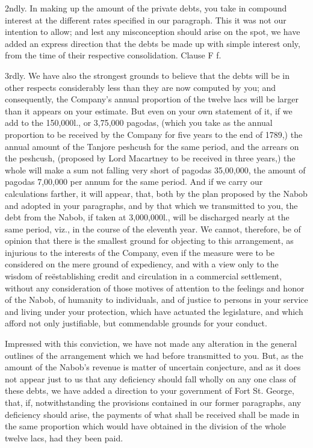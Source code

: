 2ndly. In making up the amount of the private debts, you take in compound interest at the different rates specified in our paragraph. This it was not our intention to allow; and lest any misconception should arise on the spot, we have added an express direction that the debts be made up with simple interest only, from the time of their respective consolidation. Clause F f.

3rdly. We have also the strongest grounds to believe that the debts will be in other respects considerably less than they are now computed by you; and consequently, the Company's annual proportion of the twelve lacs will be larger than it appears on your estimate. But even on your own statement of it, if we add to the 150,000l., or 3,75,000 pagodas, (which you take as the annual proportion to be received by the Company for five years to the end of 1789,) the annual amount of the Tanjore peshcush for the same period, and the arrears on the peshcush, (proposed by Lord Macartney to be received in three years,) the whole will make a sum not falling very short of pagodas 35,00,000, the amount of pagodas 7,00,000 per annum for the same period. And if we carry our calculations farther, it will appear, that, both by the plan proposed by the Nabob and adopted in your paragraphs, and by that which we transmitted to you, the debt from the Nabob, if taken at 3,000,000l., will be discharged nearly at the same period, viz., in the course of the eleventh year. We cannot, therefore, be of opinion that there is the smallest ground for objecting to this arrangement, as injurious to the interests of the Company, even if the measure were to be considered on the mere ground of expediency, and with a view only to the wisdom of reëstablishing credit and circulation in a commercial settlement, without any consideration of those motives of attention to the feelings and honor of the Nabob, of humanity to individuals, and of justice to persons in your service and living under your protection, which have actuated the legislature, and which afford not only justifiable, but commendable grounds for your conduct.

Impressed with this conviction, we have not made any alteration in the general outlines of the arrangement which we had before transmitted to you. But, as the amount of the Nabob's revenue is matter of uncertain conjecture, and as it does not appear just to us that any deficiency should fall wholly on any one class of these debts, we have added a direction to your government of Fort St. George, that, if, notwithstanding the provisions contained in our former paragraphs, any deficiency should arise, the payments of what shall be received shall be made in the same proportion which would have obtained in the division of the whole twelve lacs, had they been paid.

